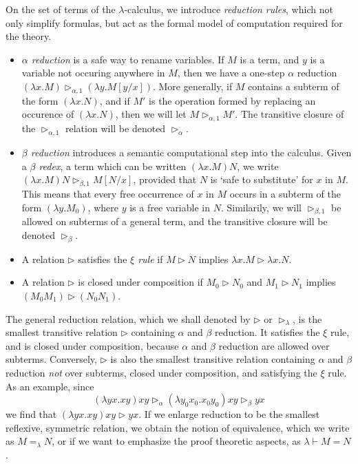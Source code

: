 On the set of terms of the $\lambda$-calculus, we introduce \emph{reduction rules}, which not only simplify formulas, but act as the formal model of computation required for the theory.
%
\begin{itemize}
    \item \emph{$\alpha$ reduction} is a safe way to rename variables. If $M$ is a term, and $y$ is a variable not occuring anywhere in $M$, then we have a one-step $\alpha$ reduction $(\lambda x.M) \rhd_{\alpha,1} (\lambda y.M[y/x])$. More generally, if $M$ contains a subterm of the form $(\lambda x.N)$, and if $M'$ is the operation formed by replacing an occurence of $(\lambda x.N)$, then we will let $M \rhd_{\alpha,1} M'$. The transitive closure of the $\rhd_{\alpha,1}$ relation will be denoted $\rhd_\alpha$.

    \item \emph{$\beta$ reduction} introduces a semantic computational step into the calculus. Given a \emph{$\beta$ redex}, a term which can be written $(\lambda x.M)N$, we write $(\lambda x.M)N \rhd_{\beta,1} M[N/x]$, provided that $N$ is `safe to substitute' for $x$ in $M$. This means that every free occurrence of $x$ in $M$ occurs in a subterm of the form $(\lambda y.M_0)$, where $y$ is a free variable in $N$. Similarily, we will $\rhd_{\beta,1}$ be allowed on subterms of a general term, and the transitive closure will be denoted $\rhd_\beta$.

    \item A relation $\rhd$ satisfies the \emph{$\xi$ rule} if $M \rhd N$ implies $\lambda x.M \rhd \lambda x.N$.

    \item A relation $\rhd$ is closed under composition if $M_0 \rhd N_0$ and $M_1 \rhd N_1$ implies $(M_0 M_1) \rhd (N_0 N_1)$.
\end{itemize}
%
The general reduction relation, which we shall denoted by $\rhd$ or $\rhd_{\lambda}$, is the smallest transitive relation $\rhd$ containing $\alpha$ and $\beta$ reduction. It satisfies the $\xi$ rule, and is closed under composition, because $\alpha$ and $\beta$ reduction are allowed over subterms. Conversely, $\rhd$ is also the smallest transitive relation containing $\alpha$ and $\beta$ reduction {\it not} over subterms, closed under composition, and satisfying the $\xi$ rule. As an example, since
%
\[ (\lambda yx.xy)xy \rhd_\alpha (\lambda y_0x_0.x_0y_0)xy \rhd_\beta yx \]
%
we find that $(\lambda yx.xy)xy \rhd yx$. If we enlarge reduction to be the smallest reflexive, symmetric relation, we obtain the notion of equivalence, which we write as $M =_\lambda N$, or if we want to emphasize the proof theoretic aspects, as $\lambda \vdash M = N$.

